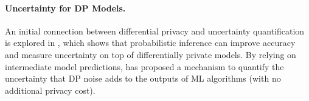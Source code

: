 \paragraph{Uncertainty for DP Models.} An initial connection between differential privacy and uncertainty quantification is explored in \citet{williams2010probabilistic}, which shows that probabilistic inference can improve accuracy and measure uncertainty on top of differentially private models. By relying on intermediate model predictions, \citet{shejwalkar2022recycling} has proposed a mechanism to quantify the uncertainty that DP noise adds to the outputs of ML algorithms (with no additional privacy cost).



